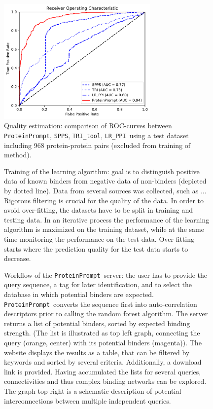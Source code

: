 \documentclass{article}
\newcommand{\spps}{\texttt{SPPS}}
\newcommand{\tri}{\texttt{TRI\_tool}}
\newcommand{\lr}{\texttt{LR\_PPI}}
\newcommand{\tool}{\texttt{ProteinPrompt}}
\begin{document}
\begin{figure}
  \centerline{\includegraphics[width=0.7\textwidth]{img/comparison_roc.pdf}}
  \caption{Quality estimation: comparison of ROC-curves between \tool, \spps, \tri, \lr\ using a test dataset including 968 protein-protein pairs (excluded from training of method).}
  \label{fig:comparison}
\end{figure}


\begin{figure}
  
  \caption{ Training of the learning algorithm: goal is to distinguish positive data of known binders from negative data of non-binders (depicted by dotted line). Data from several sources was collected, such as ... Rigorous filtering is crucial for the quality of the data. In order to avoid over-fitting, the datasets have to be split in training and testing data. In an iterative process the performance of the learning algorithm is maximized on the training dataset, while at the same time monitoring the performance on the test-data. Over-fitting starts where the prediction quality for the test data starts to decrease.}
\end{figure}


\begin{figure}
  
  \caption{ Workflow of the \tool\  server: the user has to provide the query sequence, a tag for later identification, and to select the database in which potential binders are expected. \tool\  converts the sequence first into auto-correlation descriptors prior to calling the random forest algorithm.
    The server returns a list of potential binders, sorted by expected binding strength.
    (The list is illustrated as top left graph, connecting the query (orange, center) with its potential binders (magenta)).
    The website displays the results as a table, that can be filtered by keywords and sorted by several criteria. 
    Additionally, a download link is provided. Having accumulated the lists for several queries, connectivities and thus complex binding networks can be explored.
  The graph top right is a schematic description of potential interconnections between multiple independent queries.}
\end{figure}
\end{document}
